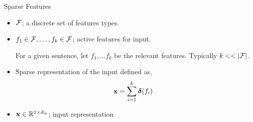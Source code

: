 \documentclass{beamer}
\begin{document}
\begin{frame}{Sparse Features}
  \begin{itemize}
  \item   $\mathcal{F}$; a discrete set of features types. 
  \item   $f_1\in\mathcal{F}, \ldots , f_k\in\mathcal{F}$; active features for input. 
    
    \air 
    
    For a given sentence, let $f_1, \ldots f_k$  be the relevant features.  Typically $k << |\mathcal{F}|$.

\air

  \item Sparse representation of the input defined as,
    \[\mathbf{x} = \sum_{i=1}^k \boldsymbol{\delta}(f_i) \]
  \item $\mathbf{x} \in \mathbb{R}^{1\times {d_{\mathrm{in}}}}$; input representation 
  \end{itemize}

\end{frame}
\end{document}
